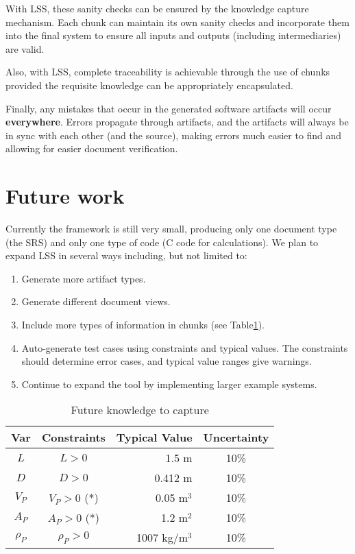 \documentclass{sig-alternate-05-2015}
\newcommand{\lss}{LSS}
\begin{document}
With \lss, these sanity checks can be ensured by the knowledge capture
mechanism. Each chunk can maintain its own sanity checks and incorporate them
into the final system to ensure all inputs and outputs (including
intermediaries) are valid.

Also, with \lss{}, complete traceability is achievable through the use of chunks
provided the requisite knowledge can be appropriately encapsulated.

Finally, any mistakes that occur in the generated software artifacts will occur
\textbf{everywhere}. Errors propagate through artifacts, and the artifacts will
always be in sync with each other (and the source), making errors much easier to
find and allowing for easier document verification.

\section{Future work} \label{sec:todo}

Currently the framework is still very small, producing only one document type
(the SRS) and only one type of code (C code for calculations). We plan to expand
\lss{} in several ways including, but not limited to:

\begin{enumerate}
\item Generate more artifact types. %
\item Generate different document views. %
\item Include more types of information in chunks (see Table\ref{tab:pcm}).
\item Auto-generate test cases using constraints and typical values. The
  constraints should determine error cases, and typical value ranges give
  warnings.
\item Continue to expand the tool by implementing larger example systems.
\end{enumerate}

\begin{table} \label{tab:pcm}
\centering
\caption{Future knowledge to capture}
\begin{tabular}{|c|c|r|c|} \hline
\textbf{Var} & \textbf{Constraints} & \textbf{Typical Value} & \textbf{Uncertainty}\\ \hline
$L$ & $L > 0$ & 1.5 m & 10\% \\ \hline
$D$ & $D > 0$ & 0.412 m & 10\% \\ \hline
$V_P$ & $V_P > 0$ (*)	& 0.05 m$^3$	& 10\% \\ \hline
$A_P$ & $A_P > 0$ (*)	& 1.2 m$^2$	& 10\% \\ \hline
$\rho_P$ & $\rho_P > 0$	& 1007 kg/m$^3$	& 10\% \\
\hline\end{tabular}
\end{table}
\end{document}
